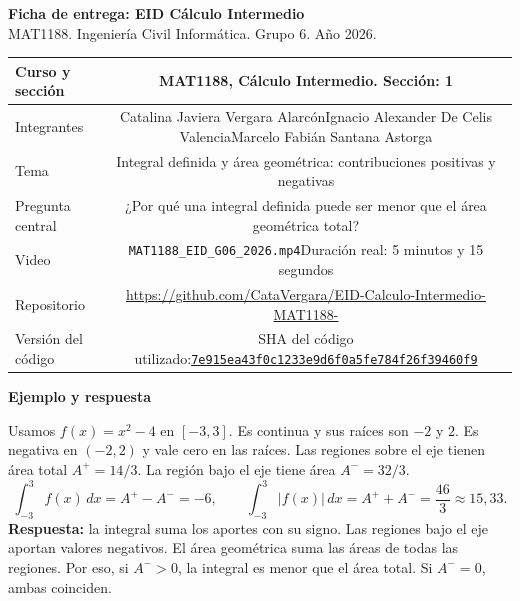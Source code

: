 \documentclass[10pt,a4paper]{article}
\newcommand{\seccion}{1}
\newcommand{\duracion}{5 minutos y 15 segundos}
\newcommand{\sha}{\href{https://github.com/CataVergara/EID-Calculo-Intermedio-MAT1188-/tree/7e915ea43f0c1233e9d6f0a5fe784f26f39460f9}{\texttt{7e915ea43f0c1233e9d6f0a5fe784f26f39460f9}}}
\newcommand{\apartado}[1]{\vspace{4pt}\textbf{\color{azul}#1}\par}
\begin{document}
\small
{\Large\bfseries\color{azul} Ficha de entrega: EID Cálculo Intermedio}\\[3pt]
{\color{gris} MAT1188. Ingeniería Civil Informática. Grupo 6. Año 2026.}

\begin{tabularx}{\textwidth}{|E|C|}
\hline
Curso y sección & MAT1188, Cálculo Intermedio. Sección: \seccion \\\hline
Integrantes & Catalina Javiera Vergara Alarcón\newline Ignacio Alexander De Celis Valencia\newline Marcelo Fabián Santana Astorga \\\hline
Tema & Integral definida y área geométrica: contribuciones positivas y negativas \\\hline
Pregunta central & ¿Por qué una integral definida puede ser menor que el área geométrica total? \\\hline
Video & \texttt{MAT1188\_EID\_G06\_2026.mp4}\newline Duración real: \duracion \\\hline
Repositorio & \url{https://github.com/CataVergara/EID-Calculo-Intermedio-MAT1188-} \\\hline
Versión del código & SHA del código utilizado:\newline \sha \\\hline
\end{tabularx}

\apartado{Ejemplo y respuesta}
Usamos $f(x)=x^2-4$ en $[-3,3]$. Es continua y sus raíces son $-2$ y $2$.
Es negativa en $(-2,2)$ y vale cero en las raíces.
Las regiones sobre el eje tienen área total $A^+=14/3$.
La región bajo el eje tiene área $A^-=32/3$.
\[
\int_{-3}^{3}f(x)\,dx=A^+-A^-=-6,\qquad
\int_{-3}^{3}|f(x)|\,dx=A^++A^-=\frac{46}{3}\approx15{,}33.
\]
\textbf{Respuesta:} la integral suma los aportes con su signo. Las regiones bajo el eje aportan valores negativos. El área geométrica suma las áreas de todas las regiones. Por eso, si $A^->0$, la integral es menor que el área total. Si $A^-=0$, ambas coinciden.
\end{document}
